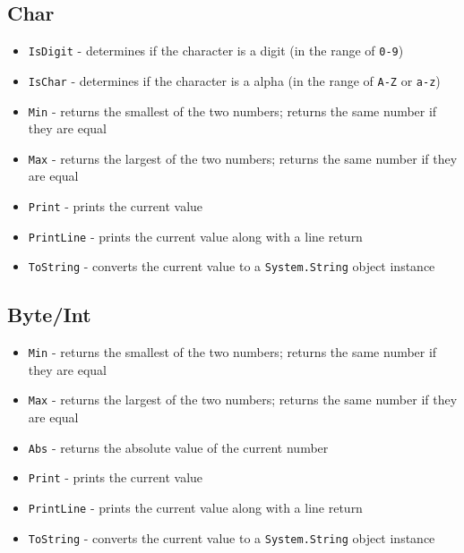 \documentclass[12pt]{article}
\begin{document}
\subsection{Char}
\begin{itemize}
    \item \texttt{IsDigit} - determines if the character is a digit (in the range of \texttt{0-9})
    \item \texttt{IsChar} - determines if the character is a alpha (in the range of \texttt{A-Z} or \texttt{a-z})
    \item \texttt{Min} - returns the smallest of the two numbers; returns the same number if they are equal
    \item \texttt{Max} - returns the largest of the two numbers; returns the same number if they are equal
    \item \texttt{Print} - prints the current value
    \item \texttt{PrintLine} - prints the current value along with a line return
    \item \texttt{ToString} - converts the current value to a \texttt{System.String} object instance
\end{itemize}

\subsection{Byte/Int}
\begin{itemize}
    \item \texttt{Min} - returns the smallest of the two numbers; returns the same number if they are equal
    \item \texttt{Max} - returns the largest of the two numbers; returns the same number if they are equal
    \item \texttt{Abs} - returns the absolute value of the current number
    \item \texttt{Print} - prints the current value
    \item \texttt{PrintLine} - prints the current value along with a line return
    \item \texttt{ToString} - converts the current value to a \texttt{System.String} object instance
\end{itemize}
\end{document}
